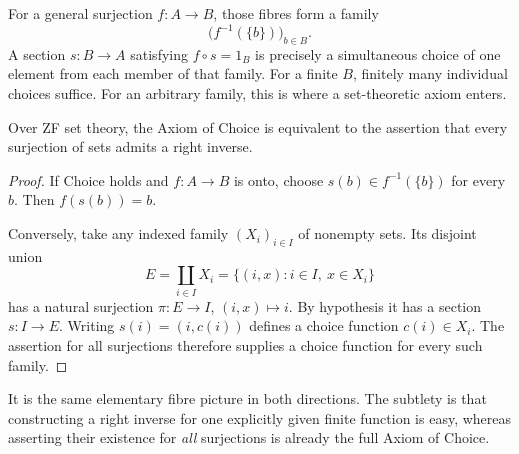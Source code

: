 For a general surjection $f:A\to B$, those fibres form a family
\[
 \bigl(f^{-1}(\{b\})\bigr)_{b\in B}.
\]
A section $s:B\to A$ satisfying $f\circ s=1_B$ is precisely a simultaneous choice of one element from each member of that family. For a finite $B$, finitely many individual choices suffice. For an arbitrary family, this is where a set-theoretic axiom enters.

\begin{theorem}
Over ZF set theory, the Axiom of Choice is equivalent to the assertion that every surjection of sets admits a right inverse.
\end{theorem}

\begin{proof}
If Choice holds and $f:A\to B$ is onto, choose $s(b)\in f^{-1}(\{b\})$ for every $b$. Then $f(s(b))=b$.

Conversely, take any indexed family $(X_i)_{i\in I}$ of nonempty sets. Its disjoint union
\[
 E=\coprod_{i\in I}X_i
   =\{(i,x):i\in I,\ x\in X_i\}
\]
has a natural surjection $\pi:E\to I$, $(i,x)\mapsto i$. By hypothesis it has a section $s:I\to E$. Writing $s(i)=(i,c(i))$ defines a choice function $c(i)\in X_i$. The assertion for all surjections therefore supplies a choice function for every such family.
\end{proof}

It is the same elementary fibre picture in both directions. The subtlety is that constructing a right inverse for one explicitly given finite function is easy, whereas asserting their existence for \emph{all} surjections is already the full Axiom of Choice.

